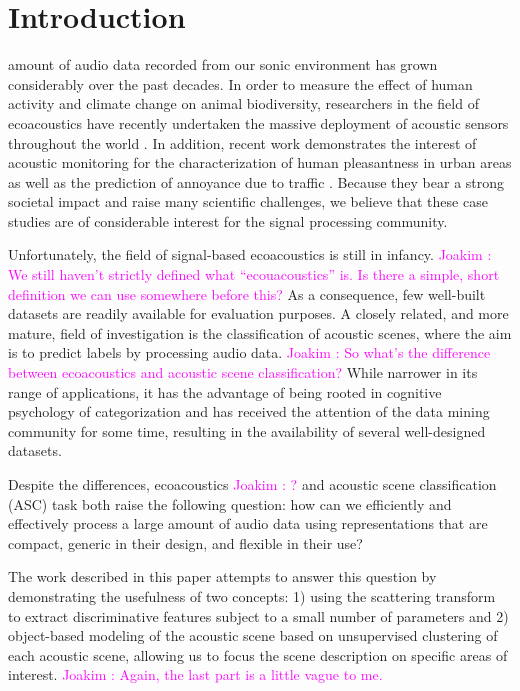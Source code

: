 \documentclass[journal]{IEEEtran}
\newcommand{\ja}[1]{\textcolor{magenta}{Joakim : #1}}
\begin{document}
\section{Introduction}

 amount of audio data recorded from our sonic environment has grown considerably over the past decades.
In order to measure the effect of human activity and climate change on animal biodiversity, researchers in the field of ecoacoustics \cite{ECOACOUSTICS2014, krause} have recently undertaken the massive deployment of acoustic sensors throughout the world \cite{warren2006urban, NessSST13, stowell13a, stowell13b}.
In addition, recent work demonstrates the interest of acoustic monitoring for the characterization of human pleasantness in urban areas \cite{lafayPartI, guyot2005urban, ricciardi2015sound} as well as the prediction of annoyance due to traffic \cite{gloaguen}.
Because they bear a strong societal impact and raise many scientific challenges, we believe that these case studies are of considerable interest for the signal processing community.

Unfortunately, the field of signal-based ecoacoustics is still in infancy. \ja{We still haven't strictly defined what ``ecouacoustics'' is. Is there a simple, short definition we can use somewhere before this?}
As a consequence, few well-built datasets are readily available for evaluation purposes.
A closely related, and more mature, field of investigation is the classification of acoustic scenes, where the aim is to predict labels by processing audio data. \ja{So what's the difference between ecoacoustics and acoustic scene classification?}
While narrower in its range of applications, it has the advantage of being rooted in cognitive psychology of categorization \cite{dubois2006cognitive, maffiolo_caracterisation_1999, guastavino_ideal_2006} and has received the attention of the data mining community for some time, resulting in the availability of several well-designed datasets.

Despite the differences, ecoacoustics \ja{?} and acoustic scene classification (ASC) task both raise the following question: how can we efficiently and effectively process a large amount of audio data using representations that are compact, generic in their design, and flexible in their use?

The work described in this paper attempts to answer this question by demonstrating the usefulness of two concepts: 1) using the scattering transform to extract discriminative features subject to a small number of parameters and 2) object-based modeling of the acoustic scene based on unsupervised clustering of each acoustic scene, allowing us to focus the scene description on specific areas of interest. \ja{Again, the last part is a little vague to me.}
\end{document}

